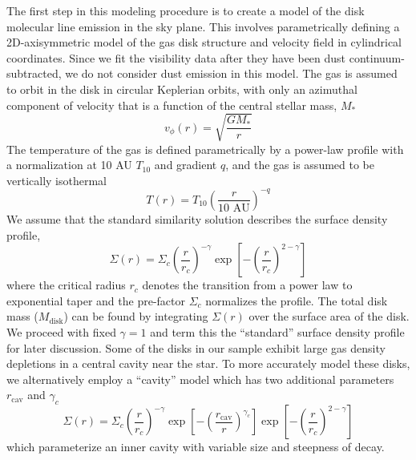 \documentclass{aastex6}
\begin{document}
The first step in this modeling procedure is to create a model of the disk molecular line emission in the sky plane. This involves parametrically defining a 2D-axisymmetric model of the gas disk structure and velocity field in cylindrical coordinates. Since we fit the visibility data after they have been dust continuum-subtracted, we do not consider dust emission in this model. The gas is assumed to orbit in the disk in circular Keplerian orbits, with only an azimuthal component of velocity that is a function of the central stellar mass, $M_\ast$
\begin{equation}
	v_\phi(r) = \sqrt{\frac{G M_\ast}{r}}
\end{equation}
The temperature of the gas is defined parametrically by a power-law profile with a normalization at 10 AU $T_{10}$ and gradient $q$, and the gas is assumed to be vertically isothermal
\begin{equation}
	T(r) = T_{10} \left ( \frac{r}{\textrm{10 AU}}\right)^{-q}
\end{equation}
We assume that the standard \citet{lynden-bell74} similarity solution describes the surface density profile,
\begin{equation}
\Sigma(r) = \Sigma_c \left (\frac{r}{r_c} \right)^{- \gamma} \exp \left[ - \left(\frac{r}{r_c} \right)^{2 - \gamma} \right]
\end{equation}
 where the critical radius $r_c$ denotes the transition from a power law to exponential taper and the pre-factor $\Sigma_c$ normalizes the profile. The total disk mass ($M_\textrm{disk}$) can be found by integrating $\Sigma(r)$ over the surface area of the disk. We proceed with fixed $\gamma = 1$ and term this the ``standard'' surface density profile for later discussion. Some of the disks in our sample exhibit large gas density depletions in a central cavity near the star. To more accurately model these disks, we alternatively employ a ``cavity'' model which has two additional parameters $r_\mathrm{cav}$ and $\gamma_c$
\begin{equation}
\Sigma(r) = \Sigma_c \left (\frac{r}{r_c} \right)^{- \gamma} \exp \left [- \left ( \frac{r_\mathrm{cav}}{r} \right)^{\gamma_c} \right ]  \exp \left[ - \left(\frac{r}{r_c} \right)^{2 - \gamma} \right]
\end{equation}
which parameterize an inner cavity with variable size and steepness of decay.
\end{document}
